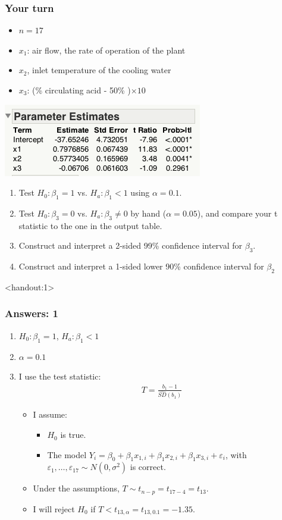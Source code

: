 \documentclass[handout]{beamer}\usepackage[]{graphicx}\usepackage[]{color}
\newcommand{\answers}{1}
\providecommand{\e}{\varepsilon}
\providecommand{\wh}[1]{\widehat{#1}}
\numberwithin{equation}{section}
\begin{document}
\begin{frame}
\frametitle{Your turn} \scriptsize
\begin{itemize}
\item $n = 17$
\item $x_1$: air flow, the rate of operation of the plant
\pause \item $x_2$, inlet temperature of the cooling water
\pause \item $x_3$: (\% circulating acid - 50\% )$\times 10$
\end{itemize}
\begin{center}
 \includegraphics{../../fig/stackparams.png}
\end{center}
\begin{enumerate}[1. ]
\pause \item Test $H_0: \beta_1 = 1$ vs. $H_a: \beta_1 < 1$ using $\alpha = 0.1$. 
\pause \item Test $H_0: \beta_3 = 0$ vs. $H_a: \beta_3 \ne 0$ by hand ($\alpha = 0.05$), and compare your t statistic to the one in the output table.
\pause \item Construct and interpret a 2-sided 99\% confidence interval for $\beta_3$. 
\pause \item Construct and interpret a 1-sided lower 90\% confidence interval for $\beta_2$
\end{enumerate}
\end{frame}

\begin{frame}<handout:\answers>
\frametitle{Answers: 1}
\begin{enumerate}[1. ]
\item $H_0: \beta_1 = 1$, $H_a: \beta_1 < 1$
\pause \item $\alpha = 0.1$
\pause \item I use the test statistic:
\pause \begin{align*}
T = \frac{b_1 - 1}{\wh{SD}(b_1)}
\end{align*}
\begin{itemize}
\pause \item I assume:
\begin{itemize}
\pause \item $H_0$ is true.
\pause \item The model $Y_i = \beta_0 + \beta_1 x_{1, i} + \beta_1 x_{2, i} + \beta_1 x_{3, i} + \e_i$, with $\e_1, \ldots, \e_{17} \sim N(0, \sigma^2)$ is correct.
\end{itemize}
\pause \item Under the assumptions, $T \sim t_{n - p} = t_{17 - 4} = t_{13}$.
\pause \item I will reject $H_0$ if $T< t_{13,\alpha} = t_{13, 0.1} = -1.35$.
\end{itemize}
\end{enumerate}
\end{frame}
\end{document}
